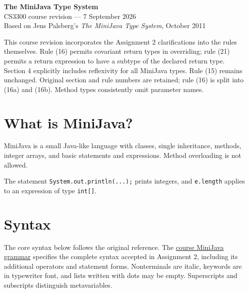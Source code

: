 \documentclass[11pt,a4paper]{article}
\begin{document}
\begin{center}
{\LARGE\bfseries The MiniJava Type System}\\[7pt]
{\large CS3300 course revision --- 7 September 2026}\\[5pt]
Based on Jens Palsberg's \emph{The MiniJava Type System}, October 2011
\end{center}

This course revision incorporates the Assignment 2 clarifications into the rules
 themselves. Rule (16) permits covariant return types in overriding; rule (21)
 permits a return expression to have a subtype of the declared return type.
 Section 4 explicitly includes reflexivity for all MiniJava types. Rule (15)
 remains unchanged. Original section and rule numbers are retained; rule (16)
 is split into (16a) and (16b). Method types consistently omit parameter names.

\section{What is MiniJava?}
MiniJava is a small Java-like language with classes, single inheritance, methods,
integer arrays, and basic statements and expressions. Method overloading is not
allowed.

The statement \texttt{System.out.println(...);} prints integers, and
\texttt{e.length} applies to an expression of type \texttt{int[]}.

\section{Syntax}
The core syntax below follows the original reference. The
\href{https://fplaunchpad.org/cs3300_m26/grammar/minijava/}{course MiniJava grammar}
 specifies the complete syntax accepted in Assignment 2, including its additional
 operators and statement forms. Nonterminals are italic, keywords are in
 typewriter font, and lists written with dots may be empty. Superscripts and
 subscripts distinguish metavariables.
\end{document}
